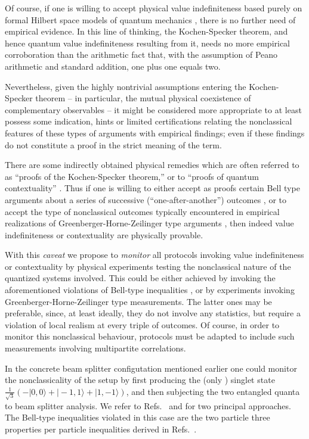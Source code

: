 \documentclass[11pt, a4paper]{article}
\theoremstyle{definition}
\begin{document}
Of course, if one is willing to accept physical value indefiniteness
based purely on formal  Hilbert space models of quantum mechanics \cite{v-neumann-55},
there is no further need of empirical evidence.
In this line of thinking, the Kochen-Specker theorem, and hence quantum value indefiniteness resulting from it, needs no more empirical corroboration
than the arithmetic fact that, with the assumption of Peano arithmetic and standard addition, one plus one equals two.

Nevertheless, given the highly nontrivial assumptions entering the Kochen-Specker theorem -- in particular, the mutual physical coexistence of
complementary observables --
it might be considered more appropriate to at least possess some indication, hints or limited certifications relating the nonclassical features
of these types of arguments with empirical findings; even if these findings do not constitute a proof
in the strict meaning of the term.

There are some indirectly obtained physical remedies which are often referred to as
``proofs of the Kochen-Specker theorem,''
or to ``proofs of quantum contextuality''
\cite{hasegawa:230401,Bartosik-09,kirch-09,PhysRevLett.103.160405,Lapkiewicz-11}.
Thus if one is
willing to either accept as proofs certain Bell type arguments about a series of successive (``one-after-another'') outcomes \cite{PhysRevLett.103.160405},
or to accept the type of nonclassical outcomes typically encountered in
empirical realizations of Greenberger-Horne-Zeilinger type arguments \cite{PhysRevLett.82.1345,panbdwz},
then indeed value indefiniteness or contextuality are physically provable.

With this {\it caveat} we propose to {\em monitor} all protocols invoking value indefiniteness or contextuality by
physical experiments testing the nonclassical nature of the quantized systems involved.
This could be either achieved by invoking the aforementioned violations of Bell-type inequalities \cite{10.1038/nature09008}, or by
experiments invoking  Greenberger-Horne-Zeilinger type measurements.
The latter ones may be preferable, since, at least ideally, they do not involve any statistics,
but require a violation of local realism at every triple of outcomes.
Of course, in order to monitor this nonclassical behaviour, protocols must be adapted to
include such measurements involving multipartite correlations.


In the concrete beam splitter configutation mentioned earlier one could monitor the nonclassicality of the setup
by first producing the (only \cite{schimpf-svozil}) singlet state
$\frac{1}{{\sqrt{3}}}\left(-|0,0\rangle+|-1,1\rangle+|1,-1\rangle\right)$,
and then subjecting the two entangled quanta to beam splitter analysis.
We refer to Refs.~\cite{zukowski-97} and \cite{svozil-2004-analog} for two principal approaches.
The Bell-type inequalities violated in this case are the two particle  three properties per particle
inequalities derived in Refs.~\cite{2000-poly,collins-gisin-2003,sliwa-2003}.


\end{document}
